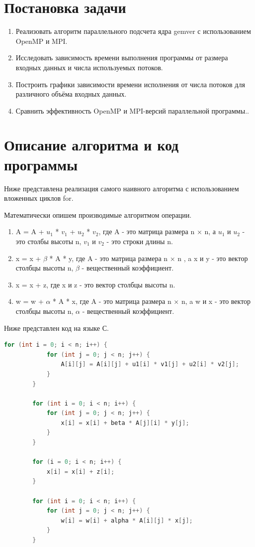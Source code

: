 \documentclass{article}
\begin{document}
\tableofcontents

\newpage

\section{Постановка задачи}

\begin{enumerate}
    \item {\large Реализовать алгоритм параллельного подсчета ядра gemver с использованием OpenMP и MPI.}
    \item {\large Исследовать зависимость времени выполнения программы от размера входных данных и числа используемых потоков}.
    \item {\large Построить графики зависимости времени исполнения от числа потоков для различного объёма входных данных}.
    \item {\large Сравнить эффективность OpenMP и MPI-версий параллельной программы.}.
\end{enumerate}

\section{Описание алгоритма и код программы}

{\large Ниже представлена реализация самого наивного алгоритма с использованием вложенных циклов for}.

{\large Математически опишем производимые алгоритмом операции.}
\begin{enumerate}
    \item A = A + $u_1$ * $v_1$ + $u_2$ * $v_2$, где A - это матрица размера n × n, а $u_1$ и $u_2$ - это столбы высоты n, $v_1$ и $v_2$ - это строки длины n.
    \item x = x + \(\beta\) * A * y, где A - это матрица размера n × n , a x и y - это вектор столбцы высоты n, \(\beta\) - вещественный коэффициент.
    \item x = x + z, где x и z - это вектор столбцы высоты n.
    \item w = w + \(\alpha\) * A * x, где A - это матрица размера n × n, a w и x - это вектор столбцы высоты n, \(\alpha\) - вещественный коэффициент.
\end{enumerate}

{\normalize Ниже представлен код на языке С.}

\begin{lstlisting}[language = C]
        for (int i = 0; i < n; i++) {
            for (int j = 0; j < n; j++) {
                A[i][j] = A[i][j] + u1[i] * v1[j] + u2[i] * v2[j];
            }
        }

        for (int i = 0; i < n; i++) {
            for (int j = 0; j < n; j++) {
                x[i] = x[i] + beta * A[j][i] * y[j];
            }
        }

        for (i = 0; i < n; i++) {
            x[i] = x[i] + z[i];
        }

        for (int i = 0; i < n; i++) {
            for (int j = 0; j < n; j++) {
                w[i] = w[i] + alpha * A[i][j] * x[j];
            }
        }
\end{lstlisting}
\end{document}
